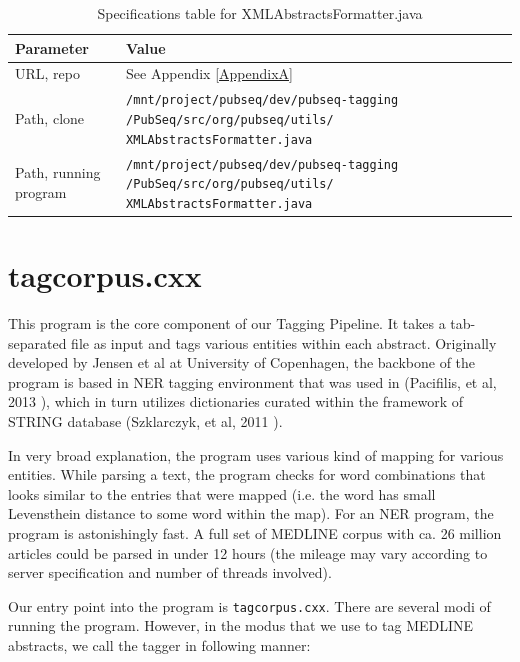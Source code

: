 \begin{table}[htbp]
\caption{Specifications table for XMLAbstractsFormatter.java}
\centering
\begin{tabularx}{\textwidth}{ | l | X | }
  \hline
  Parameter & Value \\
  \hline
  URL, repo & See Appendix \ref{AppendixA} \\
  Path, clone & \texttt{/mnt/project/pubseq/dev/pubseq-tagging /PubSeq/src/org/pubseq/utils/ XMLAbstractsFormatter.java} \\
  Path, running program & \texttt{/mnt/project/pubseq/dev/pubseq-tagging /PubSeq/src/org/pubseq/utils/ XMLAbstractsFormatter.java} \\
  \hline
\end{tabularx}
\end{table}


\section{tagcorpus.cxx}

This program is the core component of our Tagging Pipeline. It takes a tab-separated file as input and tags various entities within each abstract. Originally developed by Jensen et al at University of Copenhagen, the backbone of the program is based in NER tagging environment that was used in (Pacifilis, et al, 2013 \citep{pafilis2013species}), which in turn utilizes dictionaries curated within the framework of STRING database (Szklarczyk, et al, 2011 \citep{Szklarczyk2011string}).

In very broad explanation, the program uses various kind of mapping for various entities. While parsing a text, the program checks for word combinations that looks similar to the entries that were mapped (i.e. the word has small Levensthein distance \citep{levenshtein1966binary} to some word within the map). For an NER program, the program is astonishingly fast. A full set of MEDLINE corpus with ca. 26 million articles could be parsed in under 12 hours (the mileage may vary according to server specification and number of threads involved).

Our entry point into the program is \texttt{tagcorpus.cxx}. There are several modi of running the program. However, in the modus that we use to tag MEDLINE abstracts, we call the tagger in following manner:


